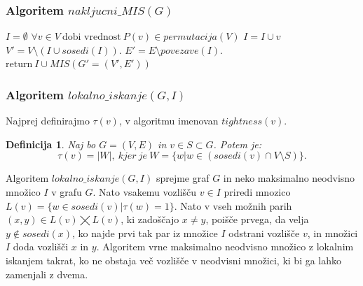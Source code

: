 \documentclass[a4paper, 12pt]{article}
\newtheorem{definicija}{Definicija}
\begin{document}
\subsubsection{Algoritem \textbf{$nakljucni\_MIS(G)$}}

\begin{algorithm}
\caption{$nakljucni\_MIS(G)$}\label{euclid}
\begin{algorithmic}[1]
\State $\textit{I} = \emptyset$
\State $\forall v \in V\ \text{dobi vrednost}\ \textit{P}(v) \in \textit{permutacija}(V)$
\State $ I = I \cup v $
\EndIf
\State $V' = V \setminus (I \cup \textit{sosedi}(I))$.
\State $E' = E \setminus \textit{povezave}(I)$.
\State $\text{return}\  I \cup \textit{MIS}(G'=(V', E'))$
\end{algorithmic}
\end{algorithm}

\newpage

\subsubsection{Algoritem $lokalno\_iskanje(G, I)$}

Najprej definirajmo $\tau(v)$, v algoritmu imenovan $tightness(v)$.
\begin{definicija}
	Naj bo $G=(V,E)$ in $v \in S \subset G$. Potem je:
	$$\tau(v) = |W|, \ kjer \ je \ W = \{w|w \in (sosedi(v) \cap V \setminus S)\}.$$
\end{definicija}

\noindent Algoritem $lokalno\_iskanje(G, I)$ sprejme graf $G$ in neko maksimalno neodvisno množico $I$ v grafu $G$. Nato vsakemu vozlišču $v \in I$
priredi mnozico $L(v) = \{w \in sosedi(v)| \tau(w) = 1\}$. Nato v vseh možnih parih $(x, y) \in L(v) \bigtimes L(v)$, ki zadoščajo $x \neq y$, 
poišče prvega, da velja $y \notin sosedi(x)$, ko najde prvi tak par iz množice $I$ odstrani vozlišče $v$, in množici $I$ doda vozlišči $x$ in $y$. 
Algoritem vrne maksimalno neodvisno množico z lokalnim iskanjem takrat, ko ne obstaja več vozlišče v neodvisni množici, ki bi ga lahko zamenjali z dvema.
\end{document}
